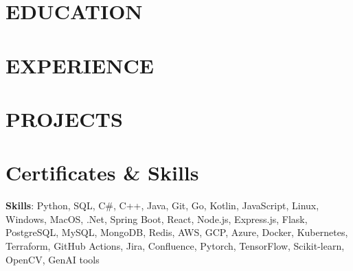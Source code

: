 \documentclass[10pt, letterpaper]{article}
\begin{document}
    \newcommand{\AND}{\unskip
        \cleaders\copy\ANDbox\hskip\wd\ANDbox
        \ignorespaces
    }
    \newsavebox\ANDbox
    \sbox\ANDbox{$|$}
    
    \begin{header}
        \normalsize
    \end{header}

    \vspace{5 pt - 0.3 cm}

\section{EDUCATION}

\vspace{0.2 cm}
\section{EXPERIENCE}

\vspace{0.1 cm}

\vspace{0.1 cm}

\vspace{0.1 cm}

\vspace{0.2 cm}
\section{PROJECTS}

\vspace{0.1 cm}

\vspace{0.1 cm}

\vspace{0.2 cm}
\section{Certificates \& Skills}

\textbf{Skills}: Python, SQL, C\#, C++, Java, Git, Go, Kotlin, JavaScript,
Linux, Windows, MacOS,
.Net, Spring Boot, React, Node.js, Express.js, Flask,
PostgreSQL, MySQL, MongoDB, Redis,
AWS, GCP, Azure, Docker, Kubernetes, Terraform, GitHub Actions,
Jira, Confluence, 
Pytorch, TensorFlow, Scikit-learn, OpenCV, GenAI tools
\end{document}
